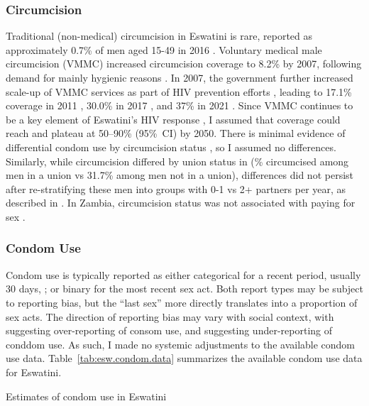 \subsubsection{Circumcision}\label{model.par.tm.circ}
Traditional (non-medical) circumcision in Eswatini is rare,
reported as approximately 0.7\% of men aged 15-49 in 2016 \cite{SHIMS2}.
Voluntary medical male circumcision (VMMC) increased circumcision coverage to 8.2\% by 2007,
following demand for mainly hygienic reasons \cite{SDHS2006}.
In 2007, the government further increased scale-up of VMMC services
as part of HIV prevention efforts \cite{SDHS2006}, leading to
17.1\% coverage in 2011 \cite{SHIMS1},
30.0\% in 2017 \cite{SHIMS2}, and
37\% in 2021 \cite{EswCOP21}.
Since VMMC continues to be a key element of Eswatini's HIV response \cite{EswCOP21},
I assumed that coverage could reach and plateau at 50--90\% (95\%~CI) by 2050.
There is minimal evidence of differential condom use by circumcision status \cite{SHIMS1},
so I assumed no differences.
Similarly, while circumcision differed by union status in \cite{SHIMS2}
(\% circumcised among men in a union vs 31.7\% among men not in a union),
differences did not persist after re-stratifying these men
into groups with 0-1 vs 2+ partners per year, as described in .
In Zambia, circumcision status was not associated with paying for sex \cite{Carrasco2020}.
\subsubsection{Condom Use}\label{model.par.tm.condom}
Condom use is typically reported as either
categorical for a recent period, usually 30 days,
\eg {}; or
binary for the most recent sex act.
Both report types may be subject to reporting bias,
but the ``last sex'' more directly translates into a proportion of sex acts.
The direction of reporting bias may vary with social context, with
\cite{Cordero-Coma2012} suggesting over-reporting of consom use, and
\cite{Behanzin2013} suggesting under-reporting of conddom use.
As such, I made no systemic adjustments to the available condom use data.
Table~\ref{tab:esw.condom.data} summarizes the available condom use data for Eswatini.
\begin{table}
  \centering
  \caption{Estimates of condom use in Eswatini}
  \label{tab:esw.condom.data}
  
\end{table}
